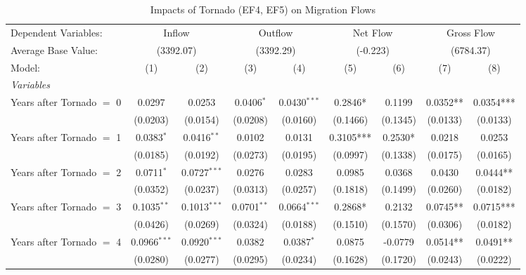 \documentclass[letterpaper]{article}
\begin{document}
\begin{table}[H]
    \centering
    \caption{Impacts of Tornado (EF4, EF5) on Migration Flows}
    \label{t4}
    \small
\begin{tabular}{lcccccccc}
   \midrule \midrule
   Dependent Variables: & \multicolumn{2}{c}{Inflow} & \multicolumn{2}{c}{Outflow} & \multicolumn{2}{c}{Net Flow} & \multicolumn{2}{c}{Gross Flow}\\
   Average Base Value: & \multicolumn{2}{c}{(3392.07)} & \multicolumn{2}{c}{(3392.29)} & \multicolumn{2}{c}{(-0.223)} & \multicolumn{2}{c}{(6784.37)}\\ 
   Model:                                    & (1)             & (2)             & (3)             & (4)             & (5)            & (6) & (7)            & (8)\\  
   \midrule
   \emph{Variables}\\
   Years after Tornado $=$ 0  & 0.0297          & 0.0253          & 0.0406$^{*}$    & 0.0430$^{***}$  & 0.2846*        & 0.1199 & 0.0352** & 0.0354***\\   
    & (0.0203)        & (0.0154)        & (0.0208)        & (0.0160)        & (0.1466)       & (0.1345) & (0.0133) & (0.0133)\\   
   Years after Tornado $=$ 1 & 0.0383$^{*}$    & 0.0416$^{**}$   & 0.0102          & 0.0131          & 0.3105***         & 0.2530* & 0.0218 & 0.0253\\   
   & (0.0185)        & (0.0192)        & (0.0273)        & (0.0195)        & (0.0997)       & (0.1338) &(0.0175) & (0.0165)\\   
   Years after Tornado $=$ 2  & 0.0711$^{*}$    & 0.0727$^{***}$  & 0.0276          & 0.0283          & 0.0985         & 0.0368 & 0.0430 & 0.0444**\\   
   & (0.0352)        & (0.0237)        & (0.0313)        & (0.0257)        & (0.1818)       & (0.1499) & (0.0260) & (0.0182) \\   
   Years after Tornado $=$ 3 & 0.1035$^{**}$   & 0.1013$^{***}$  & 0.0701$^{**}$   & 0.0664$^{***}$  & 0.2868*         & 0.2132 & 0.0745** & 0.0715***\\   
   & (0.0426)        & (0.0269)        & (0.0324)        & (0.0188)        & (0.1510)       & (0.1570) & (0.0306) & (0.0182) \\   
   Years after Tornado $=$ 4 & 0.0966$^{***}$  & 0.0920$^{***}$  & 0.0382          & 0.0387$^{*}$    & 0.0875         & -0.0779  & 0.0514** & 0.0491**\\   
   & (0.0280)        & (0.0277)        & (0.0295)        & (0.0234)        & (0.1628)       & (0.1720) & (0.0243) & (0.0222)\\   

\end{tabular}
\end{table}
\end{document}
